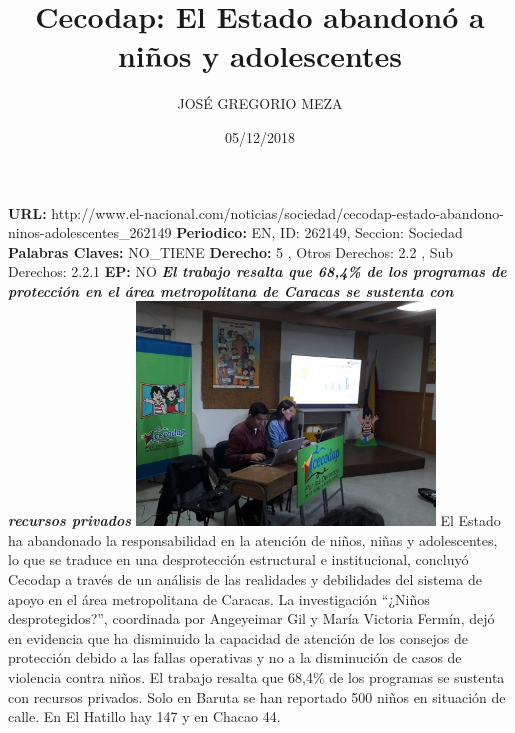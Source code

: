 \documentclass{article}%
\title{\textbf{Cecodap: El Estado abandonó a niños y adolescentes}}%
\author{JOSÉ GREGORIO MEZA}%
\date{05/12/2018}%
\begin{document}
%
\normalsize%
\maketitle%
\textbf{URL: }%
http://www.el{-}nacional.com/noticias/sociedad/cecodap{-}estado{-}abandono{-}ninos{-}adolescentes\_262149\newline%
%
\textbf{Periodico: }%
EN, %
ID: %
262149, %
Seccion: %
Sociedad\newline%
%
\textbf{Palabras Claves: }%
NO\_TIENE\newline%
%
\textbf{Derecho: }%
5%
, Otros Derechos: %
2.2%
, Sub Derechos: %
2.2.1%
\newline%
%
\textbf{EP: }%
NO\newline%
\newline%
%
\textbf{\textit{El trabajo resalta que 68,4\% de los programas de protección en el área metropolitana de Caracas se sustenta con recursos privados}}%
\newline%
\newline%
%
\includegraphics[width=300px]{44.jpg}%
\newline%
%
El Estado ha abandonado la responsabilidad en la atención de niños, niñas y adolescentes, lo que se traduce en una desprotección estructural e institucional, concluyó Cecodap a través de un análisis de las realidades y debilidades del sistema de apoyo en el área metropolitana de Caracas.%
\newline%
%
La investigación “¿Niños desprotegidos?”, coordinada por Angeyeimar Gil y María Victoria Fermín, dejó en evidencia que ha disminuido la capacidad de atención de los consejos de protección debido a las fallas operativas y no a la disminución de casos de violencia contra niños.%
\newline%
%
El trabajo resalta que 68,4\% de los programas se sustenta con recursos privados.%
\newline%
%
Solo en Baruta se han reportado 500 niños en situación de calle. En El Hatillo hay 147 y en Chacao 44.%
\end{document}
